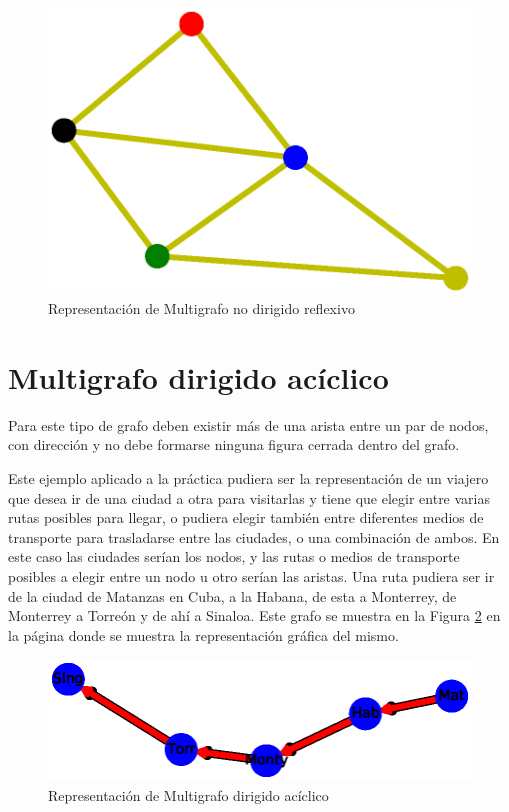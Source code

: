 \documentclass{article}
\begin{document}
\begin{figure}
    \centering
    \includegraphics[scale=0.6]{imagenes/Fig09.eps}
    \caption{Representación de Multigrafo no dirigido reflexivo}
    \label{fig:Fig09}
\end{figure}

\section{Multigrafo dirigido acíclico}

Para este tipo de grafo deben existir más de una arista entre un par de nodos, con dirección y no debe formarse ninguna figura cerrada dentro del grafo. 

Este ejemplo aplicado a la práctica pudiera ser la representación de un viajero que desea ir de una ciudad a otra para visitarlas y tiene que elegir entre varias rutas posibles para llegar, o pudiera elegir también entre diferentes medios de transporte para trasladarse entre las ciudades, o una combinación de ambos. En este caso las ciudades serían los nodos, y las rutas o medios de transporte posibles a elegir entre un nodo u otro serían las aristas. Una ruta pudiera ser ir de la ciudad de Matanzas en Cuba, a la Habana, de esta a Monterrey, de Monterrey a Torreón y de ahí a Sinaloa. Este grafo se muestra en la Figura \ref{fig:Fig10} en la página \pageref{fig:Fig10} donde se muestra la representación gráfica del mismo. 



\begin{figure}
    \centering
    \includegraphics[scale=0.6]{imagenes/Fig10.eps}
    \caption{Representación de Multigrafo dirigido acíclico}
    \label{fig:Fig10}
\end{figure}
\end{document}
